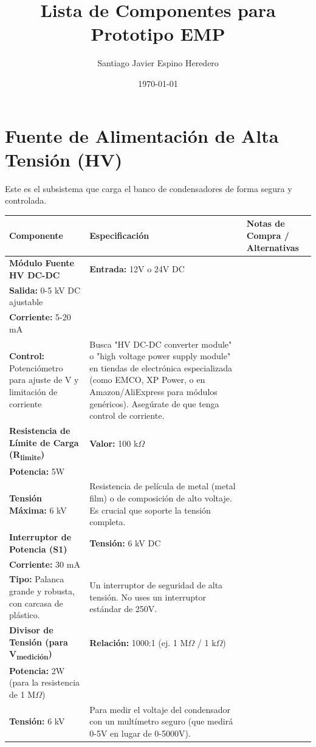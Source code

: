 \documentclass[11pt, a4paper]{article}
\title{\textbf{Lista de Componentes para Prototipo EMP}}
\author{Santiago Javier Espino Heredero}
\date{\today}
\begin{document}
\maketitle
\tableofcontents
\newpage

\section{Fuente de Alimentación de Alta Tensión (HV)}

Este es el subsistema que carga el banco de condensadores de forma segura y controlada.

\begin{longtable}{|p{3.5cm}|p{4.5cm}|p{6cm}|}
\hline
\rowcolor[gray]{0.9}
\textbf{Componente} & \textbf{Especificación} & \textbf{Notas de Compra / Alternativas} \\
\hline
\endhead

\textbf{Módulo Fuente HV DC-DC} & 
\textbf{Entrada:} 12V o 24V DC \\
\textbf{Salida:} 0-5 kV DC ajustable \\
\textbf{Corriente:} 5-20 mA \\
\textbf{Control:} Potenciómetro para ajuste de V y limitación de corriente & 
Busca "HV DC-DC converter module" o "high voltage power supply module" en tiendas de electrónica especializada (como EMCO, XP Power, o en Amazon/AliExpress para módulos genéricos). Asegúrate de que tenga control de corriente. \\
\hline

\textbf{Resistencia de Límite de Carga (R\textsubscript{limite})} & 
\textbf{Valor:} 100 k$\Omega$ \\
\textbf{Potencia:} 5W \\
\textbf{Tensión Máxima:} 6 kV & 
Resistencia de película de metal (metal film) o de composición de alto voltaje. Es crucial que soporte la tensión completa. \\
\hline

\textbf{Interruptor de Potencia (S1)} & 
\textbf{Tensión:} 6 kV DC \\
\textbf{Corriente:} 30 mA \\
\textbf{Tipo:} Palanca grande y robusta, con carcasa de plástico. & 
Un interruptor de seguridad de alta tensión. No uses un interruptor estándar de 250V. \\
\hline

\textbf{Divisor de Tensión (para V\textsubscript{medición})} & 
\textbf{Relación:} 1000:1 (ej. 1 M$\Omega$ / 1 k$\Omega$) \\
\textbf{Potencia:} 2W (para la resistencia de 1 M$\Omega$) \\
\textbf{Tensión:} 6 kV & 
Para medir el voltaje del condensador con un multímetro seguro (que medirá 0-5V en lugar de 0-5000V). \\
\hline

\end{longtable}
\end{document}
